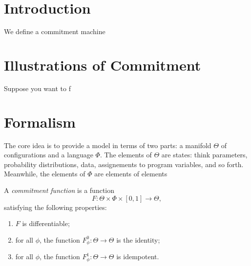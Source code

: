\documentclass{article}
\begin{document}
\section{Introduction}

We define a commitment machine



\section{Illustrations of Commitment}

\begin{example}
    Suppose you want to f
\end{example}


\section{Formalism}
The core idea is to provide a model in terms of two parts: a manifold $\Theta$
of configurations and a language $\Phi$.
The elements of $\Theta$ are states: think parameters, probability distributions, data, assignements to program variables, and so forth.
Meanwhile, the elements of $\Phi$ are elements of elements

\begin{defn}
    A \emph{commitment function} is a function
    \[
        F: \Theta \times \Phi \times [0,1] \to \Theta,
    \]
    satisfying the following properties:
    \begin{enumerate}[nosep,label={CF\arabic*.}]
        \item $F$ is differentiable;
        \item for all $\phi$, the function $F^0_\phi : \Theta \to \Theta$ is the identity;
        \item for all $\phi$, the function $F^1_\phi : \Theta \to \Theta$ is idempotent.
    \end{enumerate}
\end{defn}
\end{document}
